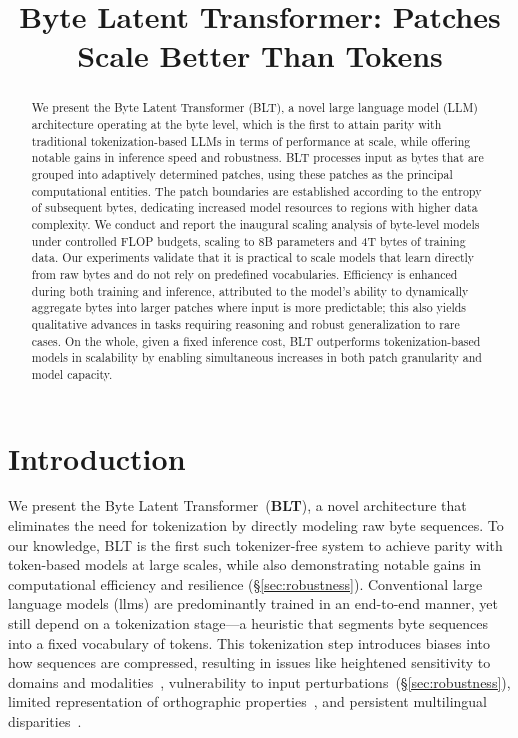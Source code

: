 \title{Byte Latent Transformer: Patches Scale Better Than Tokens}

\begin{abstract}
We present the Byte Latent Transformer ({\textsc BLT}), a novel large language model (LLM) architecture operating at the byte level, which is the first to attain parity with traditional tokenization-based LLMs in terms of performance at scale, while offering notable gains in inference speed and robustness. 
{\textsc BLT} processes input as bytes that are grouped into adaptively determined patches, using these patches as the principal computational entities. The patch boundaries are established according to the entropy of subsequent bytes, dedicating increased model resources to regions with higher data complexity. We conduct and report the inaugural scaling analysis of byte-level models under controlled FLOP budgets, scaling to 8B parameters and 4T bytes of training data. Our experiments validate that it is practical to scale models that learn directly from raw bytes and do not rely on predefined vocabularies. Efficiency is enhanced during both training and inference, attributed to the model's ability to dynamically aggregate bytes into larger patches where input is more predictable; this also yields qualitative advances in tasks requiring reasoning and robust generalization to rare cases. On the whole, given a fixed inference cost, {\textsc BLT} outperforms tokenization-based models in scalability by enabling simultaneous increases in both patch granularity and model capacity.
\end{abstract}

\section{Introduction}
\label{section:intro}

We present the Byte Latent Transformer~(\textbf{BLT}), a novel architecture that eliminates the need for tokenization by directly modeling raw byte sequences. To our knowledge, BLT is the first such tokenizer-free system to achieve parity with token-based models at large scales, while also demonstrating notable gains in computational efficiency and resilience (\S\ref{sec:robustness}). Conventional large language models (llms) are predominantly trained in an end-to-end manner, yet still depend on a tokenization stage—a heuristic that segments byte sequences into a fixed vocabulary of tokens. This tokenization step introduces biases into how sequences are compressed, resulting in issues like heightened sensitivity to domains and modalities~\citep{dagangetting}, vulnerability to input perturbations~(\S\ref{sec:robustness}), limited representation of orthographic properties~\citep{edman2024cute}, and persistent multilingual disparities~\citep{liang2023xlm,petrov2024language,limisiewicz2024myte}.

